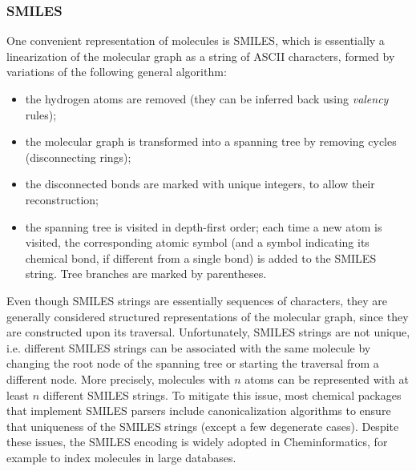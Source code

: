 \subsubsection*{SMILES}\label{subsec:smiles}
One convenient representation of molecules is SMILES, which is essentially a linearization of the molecular graph as a string of ASCII characters, formed by variations of the following general algorithm:
\begin{itemize}
    \item the hydrogen atoms are removed (they can be inferred back using \emph{valency} rules);
    \item the molecular graph is transformed into a spanning tree by removing cycles (disconnecting rings);
    \item the disconnected bonds are marked with unique integers, to allow their reconstruction;
    \item the spanning tree is visited in depth-first order; each time a new atom is visited, the corresponding atomic symbol (and a symbol indicating its chemical bond, if different from a single bond) is added to the SMILES string. Tree branches are marked by parentheses.
\end{itemize}
Even though SMILES strings are essentially sequences of characters, they are generally considered structured representations of the molecular graph, since they are constructed upon its traversal. Unfortunately, SMILES strings are not unique, i.e. different SMILES strings can be associated with the same molecule by changing the root node of the spanning tree or starting the traversal from a different node. More precisely, molecules with $n$ atoms can be represented with at least $n$ different SMILES strings. To mitigate this issue, most chemical packages that implement SMILES parsers include canonicalization algorithms to ensure that uniqueness of the SMILES strings \cite{weininger1989smiles2} (except a few degenerate cases). Despite these issues, the SMILES encoding is widely adopted in Cheminformatics, for example to index molecules in large databases.

